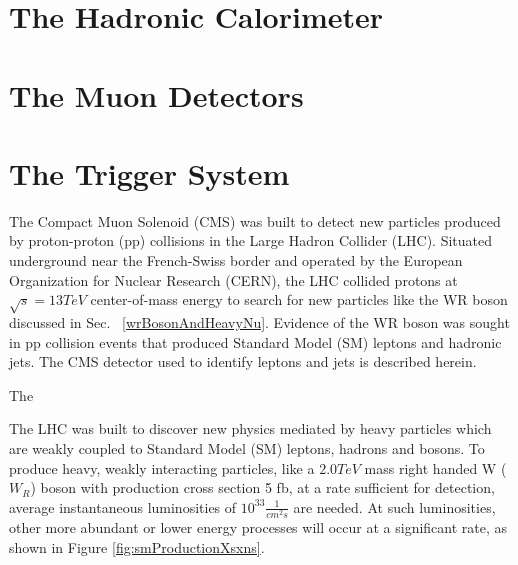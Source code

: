 


\section{The Hadronic Calorimeter}
\label{sec:hcalDescription}


\section{The Muon Detectors}
\label{sec:muonDetectorsDescription}

\section{The Trigger System}
\label{sec:triggerDescription}




The Compact Muon Solenoid (CMS) was built to detect new particles produced by proton-proton (pp) collisions 
in the Large Hadron Collider (LHC).  Situated underground near the French-Swiss border and
operated by the European Organization for Nuclear Research (CERN), the LHC collided protons at
$\sqrt{s} = 13 TeV$ center-of-mass energy to search for new particles like the WR boson discussed 
in Sec. ~\ref{wrBosonAndHeavyNu}.  Evidence of the WR boson was sought in pp collision events that
produced Standard Model (SM) leptons and hadronic jets.  The CMS detector used to identify leptons and
jets is described herein.

The

The LHC was built to discover new physics mediated by heavy particles which are weakly coupled to Standard Model (SM)
leptons, hadrons and bosons.  To produce heavy, weakly interacting particles, like a $2.0 TeV$ mass right handed W ($W_{R}$) boson
with production cross section 5 fb, at a rate sufficient for detection, average instantaneous luminosities of
$10^{33} \frac{1}{cm^{2}s}$ are needed.  At such luminosities, other more abundant or lower energy processes will occur
at a significant rate, as shown in Figure \ref{fig:smProductionXsxns}.

